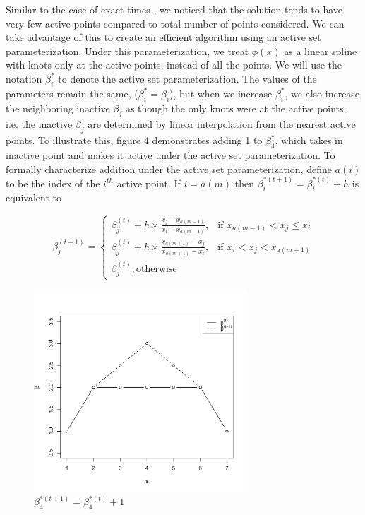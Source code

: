 	Similar to the case of exact times \cite{RefRuf2007}, we noticed that the solution tends to have very few active points compared to total number of points considered. We can take advantage of this to create an efficient algorithm using an active set parameterization. Under this parameterization, we treat $\phi(x)$ as a linear spline with knots only at the active points, instead of all the points. We will use the notation $\beta_i^*$ to denote the active set parameterization. The values of the parameters remain the same,  ($\beta_i^* = \beta_i$), but when we increase $\beta_i^*$, we also increase the neighboring inactive $\beta_j$ as though the only knots were at the active points, i.e. the inactive $\beta_j$ are determined by linear interpolation from the nearest active points. To illustrate this, figure 4 demonstrates adding 1 to $\beta_4^*$, which takes in inactive point and makes it active under the active set parameterization. To formally characterize addition under the active set parameterization, define $a(i)$ to be the index of the $i^{th}$ active point. If $i = a(m)$ then $\beta_i^{*(t+1)} = \beta_i^{*(t)} + h$ is equivalent to 
		
	\[
	\beta^{(t+1)}_j = 
	\begin{cases}
		\beta^{(t)}_j + h \times \frac{x_j - x_{a(m-1)} } {x_{i} - x_{a(m-1)} } , &  \textrm{if } x_{a(m-1)} < x_j  \leq x_{i} \\  
		\beta^{(t)}_j + h \times \frac{x_{a(m+1)} - x_j} {x_{a(m+1)} - x_{i} }, & \textrm{if } x_{ i} < x_j < x_{a(m+1)} \\ 
		\beta^{(t)}_j,  \textrm{otherwise}
	\end{cases}
	\]

	
\begin{figure}[h]
\centerline{\includegraphics[width = 8cm]{ActivePoint.pdf}}
\caption{$\beta_4^{*(t+1)} = \beta_4^{*(t) }+1$}
\end{figure}		
		
